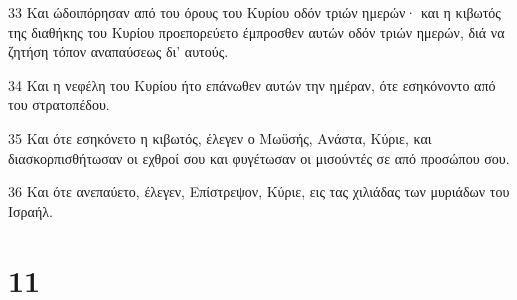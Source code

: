 \par 33 Και ώδοιπόρησαν από του όρους του Κυρίου οδόν τριών ημερών· και η κιβωτός της διαθήκης του Κυρίου προεπορεύετο έμπροσθεν αυτών οδόν τριών ημερών, διά να ζητήση τόπον αναπαύσεως δι' αυτούς.
\par 34 Και η νεφέλη του Κυρίου ήτο επάνωθεν αυτών την ημέραν, ότε εσηκόνοντο από του στρατοπέδου.
\par 35 Και ότε εσηκόνετο η κιβωτός, έλεγεν ο Μωϋσής, Ανάστα, Κύριε, και διασκορπισθήτωσαν οι εχθροί σου και φυγέτωσαν οι μισούντές σε από προσώπου σου.
\par 36 Και ότε ανεπαύετο, έλεγεν, Επίστρεψον, Κύριε, εις τας χιλιάδας των μυριάδων του Ισραήλ.

\chapter{11}

